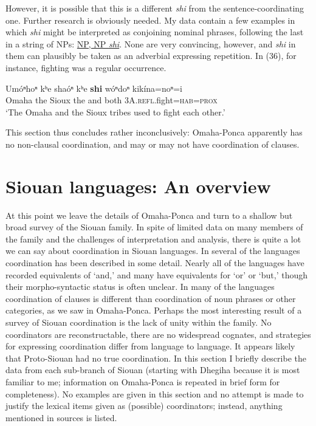 \documentclass[output=paper]{LSP/langsci}
\begin{document}
However, it is possible that this is a different \textit{shi} from the sentence-coordinating one. Further research is obviously needed. My data contain a few examples in which \textit{shi} might be interpreted as conjoining nominal phrases, following the last in a string of NPs:  \underline{NP, NP \textit{shi}}. None are very convincing, however, and \textit{shi} in them can plausibly be taken as an adverbial expressing repetition. In (36), for instance, fighting was a regular occurrence.

\begin{exe}
\ex
\gll Um\'oⁿhoⁿ kʰe sha\'oⁿ kʰe \textbf{shi}  w\'oⁿdoⁿ 	kik\'ina=noⁿ=i \\
Omaha    	the 	Sioux  	the 	and both \textsc{3A}.\textsc{refl}.fight=\textsc{hab}=\textsc{prox} \\
\trans `The Omaha and the Sioux tribes used to fight each other.'    
\end{exe}

This section thus concludes rather inconclusively: Omaha-Ponca apparently has no non-clausal coordination, and may or may not have coordination of clauses. 

\section{Siouan languages: An overview}

At this point we leave the details of Omaha-Ponca and turn to a shallow but broad survey of the Siouan family. In spite of limited data on many members of the family and the challenges of interpretation and analysis, there is quite a lot we can say about coordination in Siouan languages. In several of the languages coordination has been described in some detail. Nearly all of the languages have recorded equivalents of `and,' and many have equivalents for `or' or `but,' though their morpho-syntactic status is often unclear. In many of the languages coordination of clauses is different than coordination of noun phrases or other categories, as we saw in Omaha-Ponca. Perhaps the most interesting result of a survey of Siouan coordination is the lack of unity within the family. No coordinators are reconstructable, there are no widespread cognates, and strategies for expressing coordination differ from language to language. It appears likely that Proto-Siouan had no true coordination. In this section I briefly describe the data from each sub-branch of Siouan (starting with Dhegiha because it is most familiar to me; information on Omaha-Ponca is repeated in brief form for completeness). No examples are given in this section and no attempt is made to justify the lexical items given as (possible) coordinators; instead, anything mentioned in sources is listed.
\end{document}
